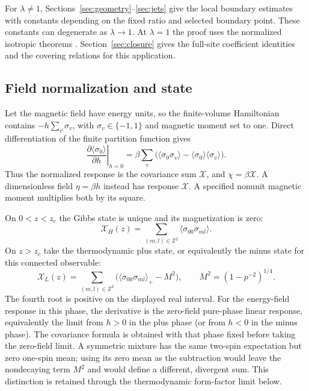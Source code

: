 \documentclass[11pt]{article}
\numberwithin{equation}{section}
\theoremstyle{definition}
\newcommand{\Z}{\mathbb Z}
\newcommand{\XH}{\mathcal X_H}
\newcommand{\XL}{\mathcal X_L}
\begin{document}
For $\lambda\ne1$, Sections~\ref{sec:geometry}--\ref{sec:jets}
give the local boundary estimates with constants depending on the
fixed ratio and selected boundary point. These constants can
degenerate as $\lambda\to1$. At $\lambda=1$ the proof uses the
normalized isotropic theorems \cite{LTsource,HTsource}.
Section~\ref{sec:closure} gives the full-site coefficient identities
and the covering relations for this application.

\subsection{Field normalization and state}

Let the magnetic field have energy units, so the finite-volume Hamiltonian
contains $-h\sum_v\sigma_v$, with $\sigma_v\in\{-1,1\}$ and magnetic
moment set to one. Direct differentiation of the finite partition
function gives
\[
 \left.\frac{\partial\langle\sigma_0\rangle}{\partial h}\right|_{h=0}
 =\beta\sum_v\bigl(\langle\sigma_0\sigma_v\rangle
                         -\langle\sigma_0\rangle\langle\sigma_v\rangle\bigr).
\]
Thus the normalized response is the covariance sum $\mathcal X$, and
$\chi=\beta\mathcal X$. A dimensionless field $\eta=\beta h$ instead
has response $\mathcal X$. A specified nonunit magnetic moment multiplies
both by its square.

On $0<z<z_c$ the Gibbs state is unique and its magnetization is zero:
\[
 \XH(z)=\sum_{(m,l)\in\Z^2}\langle\sigma_{00}\sigma_{ml}\rangle.
\]
On $z>z_c$ take the thermodynamic plus state, or equivalently the minus
state for this connected observable:
\[
 \XL(z)=\sum_{(m,l)\in\Z^2}
       \bigl(\langle\sigma_{00}\sigma_{ml}\rangle_+-M^2\bigr),
 \qquad M^2=(1-p^{-2})^{1/4}.
\]
The fourth root is positive on the displayed real interval.
For the energy-field response in this phase, the derivative is the
zero-field pure-phase linear response, equivalently the limit from
$h>0$ in the plus phase (or from $h<0$ in the minus phase).
The covariance formula is obtained with that phase fixed before taking
the zero-field limit. A symmetric
mixture has the same two-spin expectation but zero one-spin mean; using
its zero mean as the subtraction would leave the nondecaying term $M^2$
and would define a different, divergent sum. This distinction is retained
through the thermodynamic form-factor limit below.
\end{document}
